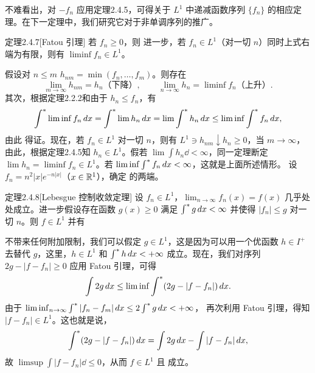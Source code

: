 不难看出，对 $-f_n$ 应用定理2.4.5，可得关于 $L^1$ 中递减函数序列 $\{f_n\}$ 的相应定理。在下一定理中，我们研究它对于非单调序列的推广。
\begin{statement}{定理}{2.4.7}[Fatou 引理]
若 $f_n\ge0$，则
进一步，若 $f_n\in L^1$（对一切 $n$）同时上式右端为有限，则有 $\liminf f_n\in L^1$。
\end{statement}
\Proof 假设对 $n\le m$
$h_{nm}=\min(f_n,\ldots,f_m)$。则存在
\[\lim_{m\to\infty}h_{nm}=h_n\text{（下降）},\qquad\lim_{n\to\infty}h_n=\liminf f_n\text{（上升）}.\]
其次，根据定理2.2.2和由于 $h_n\le f_n$，有
\[\int^{*}\liminf f_n\,dx=\int^{*}\lim h_n\,dx=\lim\int^{*} h_n\,dx\le\liminf\int^{*} f_n\,dx,\]
由此  得证。现在，若 $f_n\in L^1$ 对一切 $n$，则有 $L^1\ni h_{nm}\downarrow h_n\ge0$，当 $m\to\infty$，由此，根据定理2.4.5知 $h_n\in L^1$。假若 $\lim\int h_n\dd<\infty$，同一定理断定 $\lim h_n=\liminf f_n\in L^1$。若 $\liminf\int^{*} f_n\,dx<\infty$，这就是上面所述情形。
\Exercise 设 $f_n=n^2|x|e^{-n|x|}$（$x\in\mathbb R^1$），确定  的两端。
\begin{statement}{定理}{2.4.8}[Lebesgue 控制收敛定理]
设 $f_n\in L^1$，$\lim_{n\to\infty}f_n(x)=f(x)$ 几乎处处成立。进一步假设存在函数 $g(x)\ge0$ 满足 $\int^{*} g\,dx<\infty$ 并使得 $|f_n|\le g$ 对一切 $n$。则 $f\in L^1$ 并有
\end{statement}
\Proof 不带来任何附加限制，我们可以假定 $g\in L^1$，这是因为可以用一个优函数 $h\in I^+$ 去替代 $g$，这里，$h\in L^1$ 和 $\int^{*} h\,dx<+\infty$ 成立。现在，我们对序列 $2g-|f-f_n|\ge0$ 应用 Fatou 引理，可得
\[\int2g\,dx\le\liminf\int^{*}(2g-|f-f_n|)\,dx.\]
由于 $\liminf_{n\to\infty}\int^{*}|f_n-f_m|\,dx\le2\int^{*} g\,dx<+\infty$，
再次利用 Fatou 引理，得知 $|f-f_n|\in L^1$。这也就是说，
\[\int^{*}(2g-|f-f_n|)\,dx=\int2g\,dx-\int|f-f_n|\,dx,\]
故 $\limsup\int|f-f_n|\dd\le0$，从而 $f\in L^1$ 且  成立。

